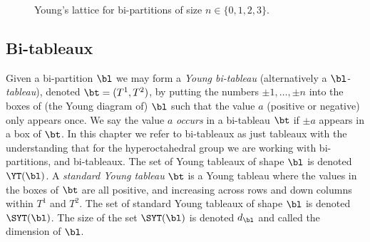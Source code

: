 \documentclass[11pt]{report}
\begin{document}
\begin{figure}[H]
{
		
		\caption[Young's lattice for bi-partitions of size $n \in \{0,1,2, 3\}$]{Young's lattice for bi-partitions of size $n \in \{0,1,2, 3\}$.}
		
		\label{chpt6:fig:lattice}
	}
\end{figure}




\subsection{Bi-tableaux}

Given a bi-partition $\bl$ we may form a \emph{Young bi-tableau} (alternatively a \emph{$\bl$-tableau}), denoted $\bt = (T^{1},T^{2})$, by putting the numbers $\pm1, \ldots, \pm n$ into the boxes of (the Young diagram of) $\bl$ such that the value $a$ (positive or negative) only appears once. We say the value $a$ \emph{occurs} in a bi-tableau $\bt$ if $\pm a$ appears in a box of $\bt$. In this chapter we refer to bi-tableaux as just tableaux with the understanding that for the hyperoctahedral group we are working with bi-partitions, and bi-tableaux. 
The set of Young tableaux of shape $\bl$ is denoted $\YT(\bl)$. A \emph{standard Young tableau} $\bt$ is a Young tableau where the values in the boxes of $\bt$ 
are all positive, and increasing across rows and down columns within $T^{1}$ and $T^{2}$. 
The set of standard Young tableaux of shape $\bl$ is denoted $\SYT(\bl)$. The size of the set $\SYT(\bl)$ is denoted $d_{\bl}$ and called the dimension of $\bl$.
\end{document}
